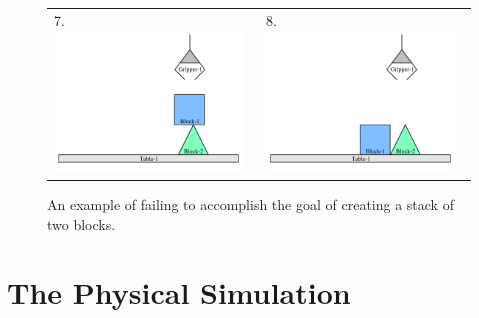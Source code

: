 \begin{figure}
\begin{center}
\begin{tabular}{p{4cm}p{4cm}}
7. \includegraphics[width=5cm]{gfx/blocks_world_example-7}  & 8. \includegraphics[width=5cm]{gfx/blocks_world_example-8}
\end{tabular}
\end{center}
\caption[An example of failing to accomplish a goal.]{An example of
  failing to accomplish the goal of creating a stack of two blocks.}
\label{figure:implemented_example_learning_storyboard}
\end{figure}


\section{The Physical Simulation}

